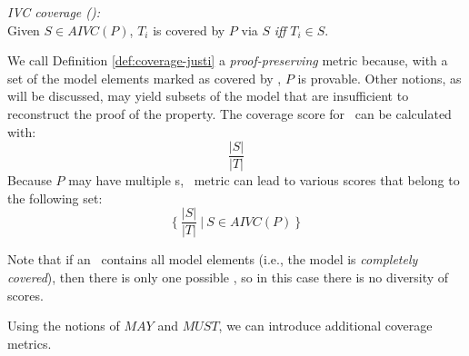 
\begin{definition} {\emph{IVC coverage (\ivccov):}} \\
\label{def:coverage-justi}
Given $S \in AIVC(P)$, $T_i$ is covered by $P$ via $S$ \emph{iff} $T_i \in S$.
\end{definition}

We call Definition \ref{def:coverage-justi} a \emph{proof-preserving} metric because, with a set of the model elements marked as covered by \ivccov ,
$P$ is provable.  Other notions, as will be discussed,
may yield subsets of the model that are insufficient to
reconstruct the proof of the property.
The coverage score for \ivccov\ can be calculated with: $$\frac{|S|}{|T|}$$
Because $P$ may have multiple \mivc s,
  \ivccov\ metric can lead to various scores that belong to the following set:
\[
\{~\frac{ |S|}{|T|}~|~S \in AIVC(P)~\}
\]

\noindent Note that if an \mivc ~contains all model elements (i.e., the model is {\em completely covered}), then there is only one possible \mivc , so in this case there is no diversity of scores.


Using the notions of $MAY$ and $MUST$, we can introduce additional coverage metrics.

